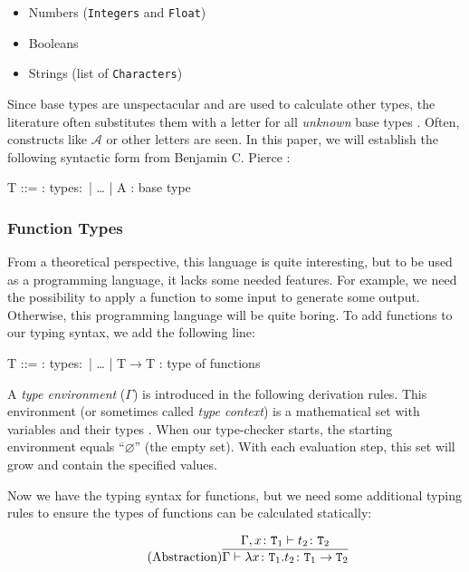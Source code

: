 \begin{itemize}
    \item Numbers (\texttt{Integers} and \texttt{Float})
    \item Booleans
    \item Strings (list of \texttt{Characters})
\end{itemize}

Since base types are unspectacular and are used to calculate other
types, the literature often substitutes them with a letter for all
\textit{unknown} base types \cite{pierce2002ProgLang}. Often,
constructs like $\mathcal{A}$ or other letters are seen. In this
paper, we will establish the following syntactic form
from Benjamin C. Pierce \cite{pierce2002ProgLang}:

\begin{bnfgrammar}
    T ::= : types$\colon$
    | \dots
    | A : base type
\end{bnfgrammar}

\subsubsection{Function Types}

From a theoretical perspective, this language is quite interesting, but to be used
as a programming language, it lacks some needed features. For example, we need the
possibility to apply a function to some input to generate some output. Otherwise,
this programming language will be quite boring. To add functions to our typing
syntax, we add the following line:

\begin{bnfgrammar}
    T ::= : types$\colon$
    | \dots
    | T$\rightarrow$T : type of functions
\end{bnfgrammar}

A \textit{type environment} ($\Gamma$) is introduced in the following derivation rules.
This environment (or sometimes called \textit{type context}) is
a mathematical set with variables and their types \cite{pierce2002ProgLang}.
When our type-checker starts, the starting environment equals
``$\varnothing$'' (the empty set). With each evaluation step, this set will grow
and contain the specified values.

Now we have the typing syntax for functions, but we need some additional typing
rules to ensure the types of functions can be calculated statically:

\begin{equation*}
    \tag{Abstraction}
    \infer{
        \Gamma \vdash \lambda x \colon \texttt{T}_1 . t_2 \colon \texttt{T}_1 \rightarrow \texttt{T}_2
    }{
        \Gamma,x \colon \texttt{T}_1 \vdash t_2 \colon \texttt{T}_2
    }
\end{equation*}

